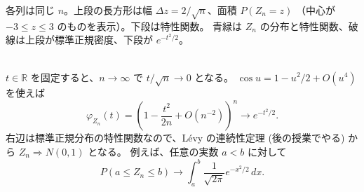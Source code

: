 \documentclass[a4paper,10pt,pdflatex,ja=standard,jafont=ipaex-type1,
  magstyle=real,scale=1]{bxjsarticle}
\newcommand{\R}{\mathbb R}
\begin{document}
\begin{center}

\end{center}
{\small\color{muted}
各列は同じ $n$。上段の長方形は幅 $\Delta z=2/\sqrt n$、面積 $P(Z_n=z)$
（中心が $-3\le z\le3$ のものを表示）。下段は特性関数。
青緑は $Z_n$ の分布と特性関数、破線は上段が標準正規密度、下段が $e^{-t^2/2}$。}\par
~\\

$t\in\R$ を固定すると、$n\to\infty$ で $t/\sqrt n\to0$ となる。
$\cos u=1-u^2/2+O(u^4)$ を使えば
$$\varphi_{Z_n}(t)
 =\left(1-\frac{t^2}{2n}+O(n^{-2})\right)^n
 \longrightarrow e^{-t^2/2}.$$
右辺は標準正規分布の特性関数なので、L\'evy の連続性定理 (後の授業でやる) から $Z_n\Rightarrow N(0,1)$ となる。
例えば、任意の実数 $a<b$ に対して
$$P(a\le Z_n\le b)\longrightarrow
 \int_a^b\frac1{\sqrt{2\pi}}e^{-x^2/2}\,dx.$$


\label{lastpage}
\end{document}
